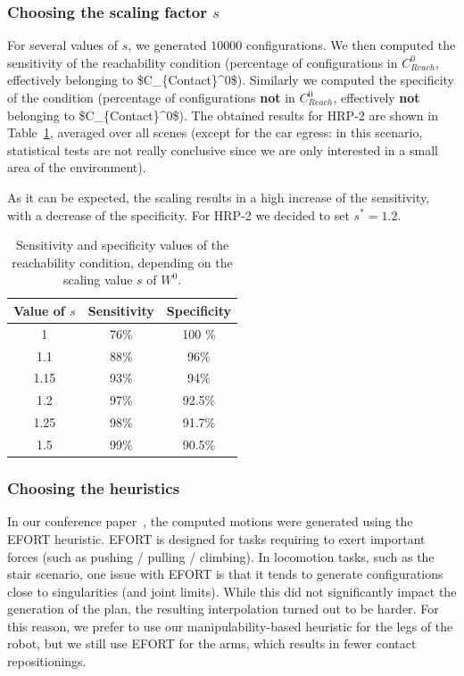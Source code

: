 \subsubsection{Choosing the scaling factor $s$} \label{sec:params}
For several values of $s$, we generated $10 000$ configurations. 
We then computed the sensitivity of the reachability condition (percentage of configurations in $C_{Reach}^0$, effectively belonging to \gls{$C_{Contact}^0$}).
Similarly we computed the specificity of the condition (percentage of configurations \textbf{not} in $C_{Reach}^0$, effectively \textbf{not} belonging to \gls{$C_{Contact}^0$}).
The obtained results for HRP-2 are shown in Table~\ref{tab:scale}, averaged over all scenes (except for the car egress: in this scenario, 
statistical tests are not really conclusive since we are only interested in a small area of the environment).

As it can be expected, the scaling results in a high increase of the sensitivity, with a decrease of the specificity.
For HRP-2 we decided to set $s^*=1.2$.

\begin{table}
\centering
\footnotesize
\begin{tabular}{c | c | c}
   Value of $s$ &  Sensitivity & Specificity\\
 \hline
   1   & 76\% & 100 \%\\
   1.1& 88\% & 96\% \\
   1.15& 93\% & 94\%\\
   1.2 & 97\% & 92.5\%\\
   1.25& 98\% & 91.7\%\\
   1.5 & 99\% & 90.5\%\\
 \end{tabular}
\caption{Sensitivity and specificity values of the reachability condition, depending on the scaling value $s$ of $W^0$.}
\label{tab:scale}
\quad
\end{table}

\subsubsection{Choosing the heuristics} \label{sec:heuristichoices}
In our conference paper~\citep{tonneauisrr15}, the computed motions were generated using the EFORT heuristic.
EFORT is designed for tasks requiring to exert important forces (such as pushing / pulling / climbing). 
In locomotion tasks, such as the stair scenario, one issue with EFORT is that it tends to generate
configurations close to singularities (and joint limits). While this did not significantly impact
the generation of the plan, the resulting interpolation turned out to be harder.
For this reason, we prefer to use our manipulability-based heuristic for the legs of the robot, but we still
use EFORT for the arms, which results in fewer contact repositionings.

